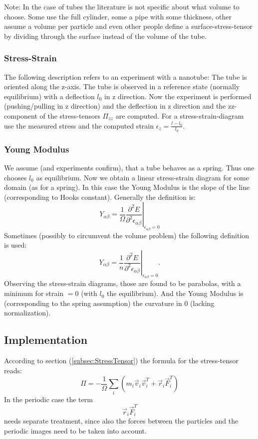 Note: In the case of tubes the literature is not specific about what volume to choose. Some use the full cylinder, some a pipe with some thickness, other assume a volume per particle and even other people define a surface-stress-tensor by dividing through the surface instead of the volume of the tube.


\subsubsection{Stress-Strain} 
The following description refers to an experiment with a nanotube: The tube is oriented along the z-axis. The tube is observed in a reference state (normally equilibrium) with a deflection \( l_0 \) in z direction. Now the experiment is performed (pushing/pulling in z direction) and the deflection in z direction and the zz-component of the stress-tensors \( \Pi_{zz} \) are computed.
For a stress-strain-diagram use the measured stress and the computed strain \( \epsilon_z = \frac{l-l_0}{l_0} \).


\subsubsection{Young Modulus}
We assume (and experiments confirm), that a tube behaves as a spring. Thus one chooses \( l_0 \) as equilibrium. Now we obtain a linear stress-strain diagram for some domain (as for a spring). In this case the Young Modulus is the slope of the line (corresponding to Hooks constant). Generally the definition is:
\[
Y_{\alpha \beta} = \frac{1}{\Omega}\left. \frac{\partial^2 E}{\partial^2 \epsilon_{\alpha \beta}} \right|_{\epsilon_{\alpha \beta} = 0}
\]
Sometimes (possibly to circumvent the volume problem) the following definition is used:
\[
Y_{\alpha \beta} = \frac{1}{n} \left. \frac{\partial^2 E}{\partial^2 \epsilon_{\alpha \beta}}\right|_{\epsilon_{\alpha \beta} = 0}.
\]
Observing the stress-strain diagrams, those are found to be parabolas, with a minimum for strain \( = 0 \) (with \( l_0\) the equilibrium). And the Young Modulus is (corresponding to the spring assumption) the curvature in 0 (lacking normalization). 

\subsection{Implementation}
\label{sec:Implementation}
According to section (\ref{subsec:StressTensor}) the formula for the stress-tensor reads:
\begin{equation}
  \label{for:nonperiodicstress}
  \Pi = -\frac{1}{\Omega} \sum_i \left( m_i\vec{v}_i\vec{v}_i^T + \vec{r}_i\vec{F}_i^T \right)
\end{equation}
In the periodic case the term
\begin{equation}
  \label{for:nonperiodicstress2}
   \vec{r}_i\vec{F}_i^T
\end{equation}
needs separate treatment, since also the forces between the particles and the periodic images need to be taken into account.


